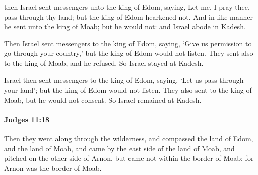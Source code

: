 			\begin{versebox}
					\item[BHS] 
					\item[ASV] then Israel sent messengers unto the king of Edom, saying, Let me, I pray thee, pass through thy land; but the king of Edom hearkened not. And in like manner he sent unto the king of Moab; but he would not: and Israel abode in Kadesh.
					\item[NIV] Then Israel sent messengers to the king of Edom, saying, ‘Give us permission to go through your country,’ but the king of Edom would not listen. They sent also to the king of Moab, and he refused. So Israel stayed at Kadesh.
					\item[NRSV] Israel then sent messengers to the king of Edom, saying, ‘Let us pass through your land’; but the king of Edom would not listen. They also sent to the king of Moab, but he would not consent. So Israel remained at Kadesh.
			\end{versebox}

		\paragraph{Judges 11:18} %
			\label{JUDGES-11-18}

			Then they went along through the wilderness, and compassed the land of Edom, and the land of Moab, and came by the east side of the land of Moab, and pitched on the other side of Arnon, but came not within the border of Moab: for Arnon was the border of Moab.

